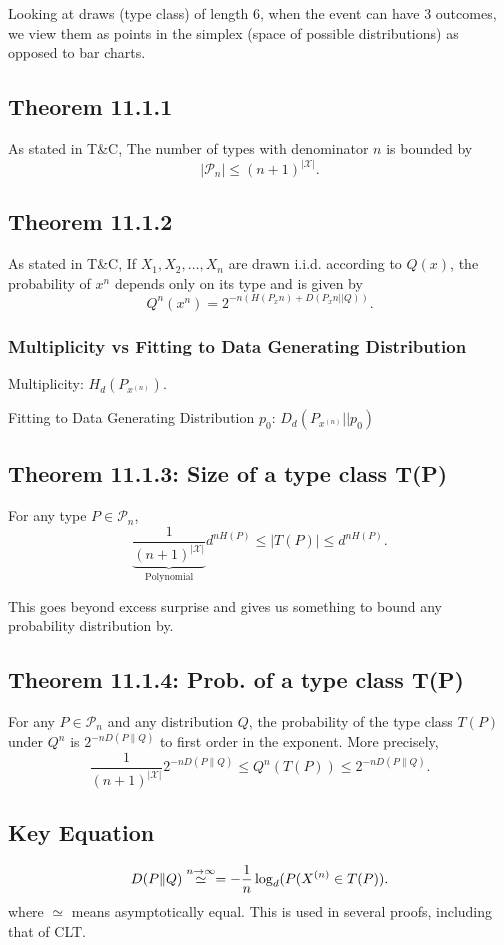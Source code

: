 Looking at draws (type class) of length 6, when the event can have 3 outcomes, we view them as points in the simplex (space of possible distributions) as opposed to bar charts.

\subsection{Theorem 11.1.1}
As stated in T\&C, 
The number of types with denominator $n$ is bounded by
$$
\left|\mathcal{P}_n\right| \leq(n+1)^{|\mathcal{X}|}.
$$

\subsection{Theorem 11.1.2}
As stated in T\&C, If $X_1, X_2, \ldots, X_n$ are drawn i.i.d. according to $Q(x)$, the probability of $x^n$ depends only on its type and is given by
$$
Q^n\left(x^n\right)=2^{-n\left(H\left(P_x n\right)+D\left(P_x n || Q\right)\right)}.
$$

\subsubsection{Multiplicity vs Fitting to Data Generating Distribution}
Multiplicity: $H_d(P_{x^{(n)}})$.

Fitting to Data Generating Distribution $p_0$: $D_d(P_{x^{(n)}} || p_0)$

\subsection{Theorem 11.1.3: Size of a type class T(P)}
For any type $P \in \mathcal{P}_n$,
$$
\underbrace{\frac{1}{(n+1)^{|\mathcal{X}|}}}_{\text{Polynomial}} d^{n H(P)} \leq|T(P)| \leq d^{n H(P)} .
$$

This goes beyond excess surprise and gives us something to bound any probability distribution by.

\subsection{Theorem 11.1.4: Prob. of a type class T(P)}
For any $P \in \mathcal{P}_n$ and any distribution $Q$, the probability of the type class $T(P)$ under $Q^n$ is $2^{-n D(P \| Q)}$ to first order in the exponent. More precisely,
$$
\frac{1}{(n+1)^{|\mathcal{X}|}} 2^{-n D(P \| Q)} \leq Q^n(T(P)) \leq 2^{-n D(P \| Q)} .
$$

\subsection{Key Equation}
$$
D(P \| Q) \stackrel{\tiny{n\to\infty}}\simeq =-\frac1n \log_d(P(X^{(n)} \in T(P)).
$$
where $\simeq$ means asymptotically equal. This is used in several proofs, including that of CLT.
